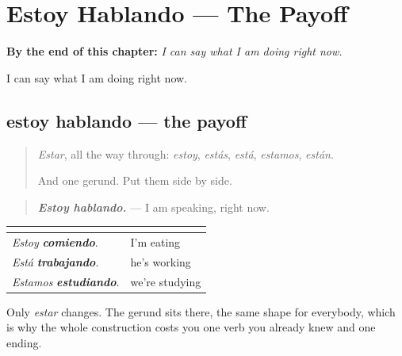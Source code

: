 
\chapter{Estoy Hablando --- The Payoff}
\label{ch:estoy-hablando}

\begin{chapteropening}
\textbf{By the end of this chapter:} \emph{I can say what I am doing right now.}

I can say what I am doing right now.
\end{chapteropening}

\section[estoy hablando]{estoy hablando — the payoff}

\label{lesson:ES-C62-estoy-hablando}



\begin{quote}
\emph{Estar}, all the way through: \emph{estoy}, \emph{estás}, \emph{está}, \emph{estamos}, \emph{están}.

And one gerund. Put them side by side.
\end{quote}

\begin{grammarlens}[title={Grammar Lens: standing in the middle of doing}]
\begin{quote}
\emph{\textbf{Estoy hablando.}} — I am speaking, right now.
\end{quote}

\noindent
\begin{tabularx}{\linewidth}{@{}>{\raggedright\arraybackslash}X>{\raggedright\arraybackslash}X@{}}
\toprule
\textbf{} & \textbf{} \\
\midrule
\emph{Estoy} \emph{\textbf{comiendo}}. & I'm eating \\
\emph{Está} \emph{\textbf{trabajando}}. & he's working \\
\emph{Estamos} \emph{\textbf{estudiando}}. & we're studying \\
\bottomrule
\end{tabularx}

Only \emph{estar} changes. The gerund sits there, the same shape for everybody, which is why the whole construction costs you one verb you already knew and one ending.
\end{grammarlens}

